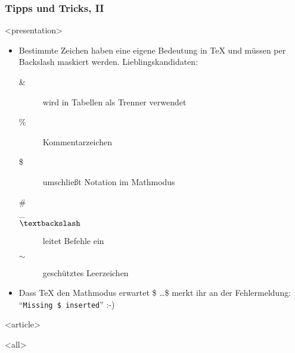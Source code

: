 \begin{frame}
\frametitle<presentation>{Tipps und Tricks, II}


\mode
<presentation>
\begin{itemize}
\item Bestimmte Zeichen haben eine eigene Bedeutung in TeX und müssen per Backslash maskiert werden. Lieblingskandidaten:
\begin{description}
  \item[\&] wird in Tabellen als Trenner verwendet
  \item[\%] Kommentarzeichen
  \item[\$] umschließt Notation im Mathmodus
  \item[\#]
  \item[\_]
  \item[$\textbackslash$] leitet Befehle ein
  \item[$\sim$] geschütztes Leerzeichen
\end{description}
\item Dass TeX den Mathmodus erwartet \$ \ldots \$ merkt ihr an der Fehlermeldung: "`\texttt{Missing \$ inserted}"' :-)
\end{itemize}

\mode
<article>

\mode
<all>

\end{frame}
\newpage

